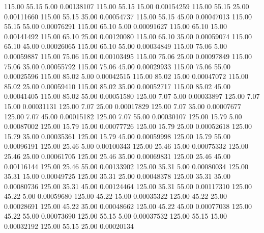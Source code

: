     115.00     55.15      5.00     0.00138107
    115.00     55.15     15.00     0.00154259
    115.00     55.15     25.00     0.00111660
    115.00     55.15     35.00     0.00054737
    115.00     55.15     45.00     0.00047013
    115.00     55.15     55.00     0.00076291
    115.00     65.10      5.00     0.00091627
    115.00     65.10     15.00     0.00141492
    115.00     65.10     25.00     0.00120080
    115.00     65.10     35.00     0.00059074
    115.00     65.10     45.00     0.00026065
    115.00     65.10     55.00     0.00034849
    115.00     75.06      5.00     0.00059887
    115.00     75.06     15.00     0.00103495
    115.00     75.06     25.00     0.00097849
    115.00     75.06     35.00     0.00055792
    115.00     75.06     45.00     0.00029933
    115.00     75.06     55.00     0.00025596
    115.00     85.02      5.00     0.00042515
    115.00     85.02     15.00     0.00047072
    115.00     85.02     25.00     0.00059410
    115.00     85.02     35.00     0.00052717
    115.00     85.02     45.00     0.00041405
    115.00     85.02     55.00     0.00051580
    125.00      7.07      5.00     0.00033897
    125.00      7.07     15.00     0.00031131
    125.00      7.07     25.00     0.00017829
    125.00      7.07     35.00     0.00007677
    125.00      7.07     45.00     0.00015182
    125.00      7.07     55.00     0.00030107
    125.00     15.79      5.00     0.00087002
    125.00     15.79     15.00     0.00077726
    125.00     15.79     25.00     0.00052618
    125.00     15.79     35.00     0.00035361
    125.00     15.79     45.00     0.00059998
    125.00     15.79     55.00     0.00096191
    125.00     25.46      5.00     0.00100343
    125.00     25.46     15.00     0.00075332
    125.00     25.46     25.00     0.00061705
    125.00     25.46     35.00     0.00069831
    125.00     25.46     45.00     0.00116144
    125.00     25.46     55.00     0.00133902
    125.00     35.31      5.00     0.00080034
    125.00     35.31     15.00     0.00049725
    125.00     35.31     25.00     0.00048378
    125.00     35.31     35.00     0.00080736
    125.00     35.31     45.00     0.00124464
    125.00     35.31     55.00     0.00117310
    125.00     45.22      5.00     0.00059680
    125.00     45.22     15.00     0.00035322
    125.00     45.22     25.00     0.00028691
    125.00     45.22     35.00     0.00048662
    125.00     45.22     45.00     0.00077038
    125.00     45.22     55.00     0.00073690
    125.00     55.15      5.00     0.00037532
    125.00     55.15     15.00     0.00032192
    125.00     55.15     25.00     0.00020134
